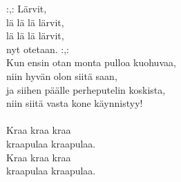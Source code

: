 
:,: Lärvit, \\ lä lä lä lärvit, \\ lä lä lä lärvit, \\ nyt otetaan. :,: \\ Kun ensin otan monta pulloa kuohuvaa, \\ niin hyvän olon siitä saan, \\ ja siihen päälle perheputelin koskista, \\ niin siitä vasta kone käynnistyy! \\ \hspace{10mm} \\ Kraa kraa kraa \\ kraapulaa kraapulaa. \\ Kraa kraa kraa \\ kraapulaa kraapulaa.